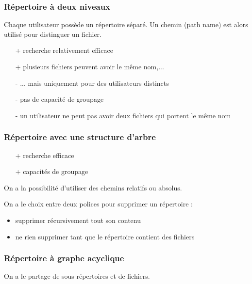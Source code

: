 		
		\subsubsection{Répertoire à deux niveaux}
		
		Chaque utilisateur possède un répertoire séparé. Un chemin (path name) est alors utilisé pour distinguer un fichier.
		
		
		\begin{itemize}
			\item[+] recherche relativement efficace
			\item[+] plusieurs fichiers peuvent avoir le même nom,... 
			\item[-] ... mais uniquement pour des utilisateurs distincts
			\item[-] pas de capacité de groupage
			\item[-] un utilisateur ne peut pas avoir deux fichiers qui portent le même nom
		\end{itemize}
		
				
		\subsubsection{Répertoire avec une structure d'arbre}
		
		
		\begin{itemize}
			\item[+] recherche efficace
			\item[+] capacités de groupage
		\end{itemize}
		
		On a la possibilité d'utiliser des chemins relatifs ou absolus.
		
		On a le choix entre deux polices pour supprimer un répertoire :
		
		\begin{itemize}
			\item supprimer récursivement tout son contenu
			\item ne rien supprimer tant que le répertoire contient des fichiers
		\end{itemize}
		
		\subsubsection{Répertoire à graphe acyclique}
		
		On a le partage de sous-répertoires et de fichiers.
		
